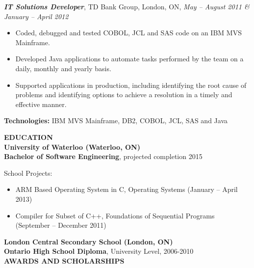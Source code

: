 \documentclass[10pt,letterpaper]{article}
\newenvironment{indentedlist}[1]%
{
\begin{list}{}%
    {\setlength{\leftmargin}{#1}}%
    \item[]%
}
{\end{list}
}
\newcommand{\job}[4]
{
    \emph{\textbf{#1}}, #2, #3, \emph{#4}
}
\newcommand{\education}[4]
{
    \textbf{#1 (#2)}\\
    \textbf{#3}, #4
}
\begin{document}
\vspace{0.5em}
\noindent \job{IT Solutions Developer}{TD Bank Group}{London, ON}{May -- August 2011 \& January -- April 2012}\\
\begin{adjustwidth}{0.1in}{0.5in}
    \begin{itemize}
	\item Coded, debugged and tested COBOL, JCL and SAS code on an IBM MVS Mainframe.
	\item Developed Java applications to automate tasks performed by the team on a daily, monthly and yearly basis.
	\item Supported applications in production, including identifying the root cause of problems and identifying 
	    options to achieve a resolution in a timely and effective manner.
    \end{itemize}
    \vspace{0.5em}
    \textbf{Technologies:} IBM MVS Mainframe, DB2, COBOL, JCL, SAS and Java
\end{adjustwidth}
\vspace{1em}
\textbf{EDUCATION} \hrulefill \\[0.5em]
\education{University of Waterloo}{Waterloo, ON}{Bachelor of Software Engineering}{projected completion 2015}
\begin{indentedlist}{2em}
		\textbf{School Projects:}
		\begin{itemize}
			\item ARM Based Operating System in C, Operating Systems (January -- April 2013)
			\item Compiler for Subset of C++, Foundations of Sequential Programs (September -- December 2011)
		\end{itemize} 
\end{indentedlist}
\education{London Central Secondary School}{London, ON}{Ontario High School Diploma}{University Level, 2006-2010}\\[1em]
\textbf{AWARDS AND SCHOLARSHIPS} \hrulefill \\
\end{document}
